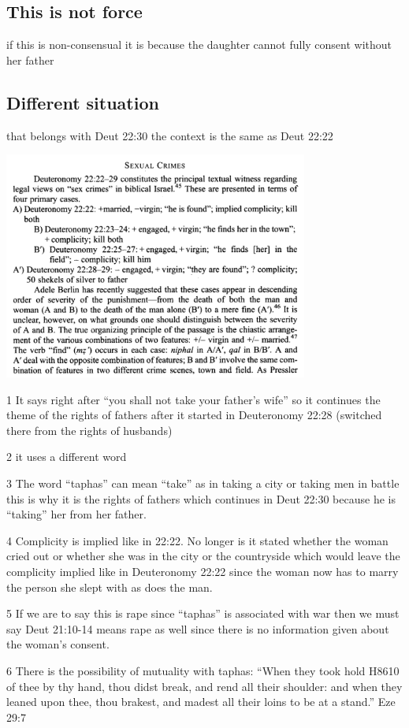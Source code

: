 \documentclass[11pt]{article}
\begin{document}
\begin{quoe}
\section{This is not force}

 if this is non-consensual it is because the daughter cannot fully consent without her father
\subsection{Different situation}
that belongs with Deut 22:30 the context is the same as Deut 22:22

\includegraphics[width=10cm]{sexual_crimes}


1 It says right after “you shall not take your father’s wife” so it continues the theme of the rights of fathers after it started in Deuteronomy 22:28 (switched there from the rights of husbands)

2 it uses a different word

3 The word “taphas” can mean “take” as in taking a city or taking men in battle this is why it is the rights of fathers which continues in Deut 22:30 because he is “taking” her from her father.

4 Complicity is implied like in 22:22. No longer is it stated whether the woman cried out or whether she was in the city or the countryside which would leave the complicity implied like in Deuteronomy 22:22 since the woman now has to marry the person she slept with as does the man.

5 If we are to say this is rape since “taphas” is associated with war then we must say Deut 21:10-14 means rape as well since there is no information given about the woman’s consent.

6 There is the possibility of mutuality with taphas: “When they took hold H8610 of thee by thy hand, thou didst break, and rend all their shoulder: and when they leaned upon thee, thou brakest, and madest all their loins to be at a stand.” Eze 29:7


\end{quoe}
\end{document}
